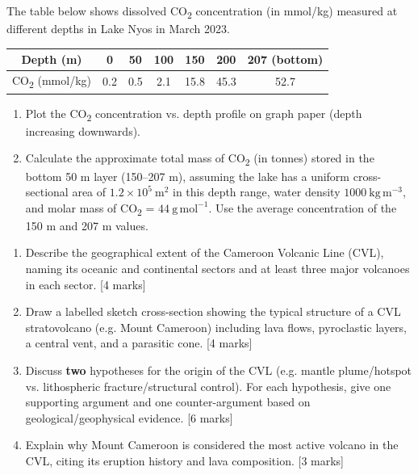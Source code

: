 \documentclass[11pt]{article}
\newcounter{popsec}
\newcounter{popsub}
\newcommand{\courssub}[1]{%
  \stepcounter{popsub}%
  \par\vspace{9pt}\noindent{\popxbold\fontsize{11.5}{13}\selectfont\color{popink}{\color{poporange}\thepopsec.\thepopsub}\hspace{6pt}#1}\par\nopagebreak\vspace{4pt}
}
\begin{document}
\begin{exercice}
The table below shows dissolved CO\textsubscript{2} concentration (in mmol/kg) measured at different depths in Lake Nyos in March 2023.

\begin{center}
\begin{tabular}{|c|c|c|c|c|c|c|}
\hline
Depth (m) & 0 & 50 & 100 & 150 & 200 & 207 (bottom) \\
\hline
CO\textsubscript{2} (mmol/kg) & 0.2 & 0.5 & 2.1 & 15.8 & 45.3 & 52.7 \\
\hline
\end{tabular}
\end{center}
\begin{enumerate}
\item Plot the CO\textsubscript{2} concentration vs. depth profile on graph paper (depth increasing downwards).
\item Calculate the approximate total mass of CO\textsubscript{2} (in tonnes) stored in the bottom 50 m layer (150–207 m), assuming the lake has a uniform cross-sectional area of $1.2 \times 10^5\ \mathrm{m}^2$ in this depth range, water density $1000\ \mathrm{kg\,m^{-3}}$, and molar mass of CO\textsubscript{2} = $44\ \mathrm{g\,mol^{-1}}$. Use the average concentration of the 150 m and 207 m values.
\end{enumerate}
\end{exercice}

\courssub{I practise}

\begin{exercice}
\begin{enumerate}
\item Describe the geographical extent of the Cameroon Volcanic Line (CVL), naming its oceanic and continental sectors and at least three major volcanoes in each sector. [4 marks]
\item Draw a labelled sketch cross-section showing the typical structure of a CVL stratovolcano (e.g. Mount Cameroon) including lava flows, pyroclastic layers, a central vent, and a parasitic cone. [4 marks]
\item Discuss \textbf{two} hypotheses for the origin of the CVL (e.g. mantle plume/hotspot vs. lithospheric fracture/structural control). For each hypothesis, give one supporting argument and one counter-argument based on geological/geophysical evidence. [6 marks]
\item Explain why Mount Cameroon is considered the most active volcano in the CVL, citing its eruption history and lava composition. [3 marks]
\end{enumerate}
\end{exercice}
\end{document}
